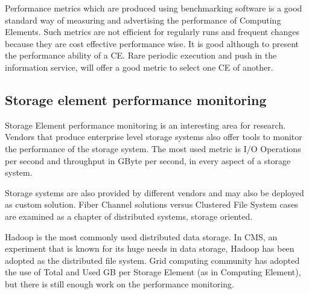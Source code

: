 Performance metrics which are produced using benchmarking software is a good standard way of measuring and advertising the performance of Computing Elements. Such metrics are not efficient for regularly runs and frequent changes because they are cost effective performance wise. It is good although to present the performance ability of a CE. Rare periodic execution and push in the information service, will offer a good metric to select one CE of another.

\subsection{Storage element performance monitoring}

Storage Element performance monitoring is an interesting area for research. Vendors that produce enterprise level storage systems also offer tools to monitor the performance of the storage system. The most used metric is I/O Operations per second and throughput in GByte per second, in every aspect of a storage system.

Storage systems are also provided by different vendors and may also be deployed as custom solution. Fiber Channel solutions versus Clustered File System cases are examined \cite{brzezniak2008analysis} as a chapter of distributed systems, storage oriented.

Hadoop is the most commonly used distributed data storage. In CMS, an experiment that is known for its huge needs in data storage, Hadoop has been adopted \cite{hadoop} as the distributed file system. Grid computing community has adopted the use of Total and Used GB per Storage Element (as in Computing Element), but there is still enough work on the performance monitoring.
